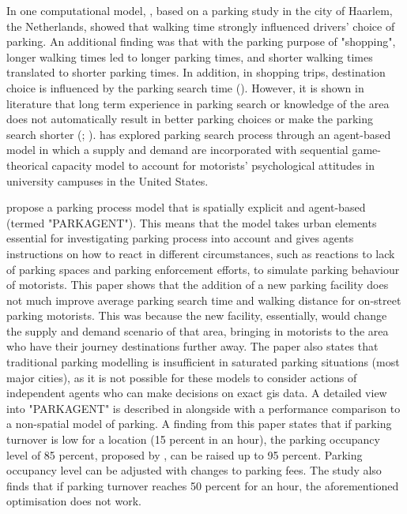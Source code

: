 In one computational model, , based on a parking study in the city of Haarlem, the Netherlands, showed that walking time strongly influenced drivers' choice of parking. An additional finding was that with the parking purpose of "shopping", longer walking times led to longer parking times, and shorter walking times translated to shorter parking times. In addition, in shopping trips, destination choice is influenced by the parking search time (\cite{Axhausen1993}). However, it is shown in literature that long term experience in parking search or knowledge of the area does not automatically result in better parking choices or make the parking search shorter (\cite{Thompson1998}; \cite{Teng2002}).  has explored parking search process through an agent-based model in which a supply and demand are incorporated with sequential game-theorical capacity model to account for motorists' psychological attitudes in university campuses in the United States. 

 propose a parking process model that is spatially explicit and agent-based (termed "PARKAGENT"). This means that the model takes urban elements essential for investigating parking process into account and gives agents instructions on how to react in different circumstances, such as reactions to lack of parking spaces and parking enforcement efforts, to simulate parking behaviour of motorists. This paper shows that the addition of a new parking facility does not much improve average parking search time and walking distance for on-street parking motorists. This was because the new facility, essentially, would change the supply and demand scenario of that area, bringing in motorists to the area who have their journey destinations further away. The paper also states that traditional parking modelling is insufficient in saturated parking situations (most major cities), as it is not possible for these models to consider actions of independent agents who can make decisions on exact \acrfull{gis} data. A detailed view into "PARKAGENT" is described in  alongside with a performance comparison to a non-spatial model of parking. A finding from this paper states that if parking turnover is low for a location (15 percent in an hour), the parking occupancy level of 85 percent, proposed by , can be raised up to 95 percent. Parking occupancy level can be adjusted with changes to parking fees. The study also finds that if parking turnover reaches 50 percent for an hour, the aforementioned optimisation does not work.

